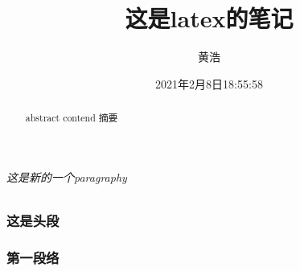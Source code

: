 \documentclass[utf8]{ctexart}
\begin{document}
\title{这是latex的笔记}
\author{黄浩}
\date{2021年2月8日18:55:58}
\maketitle
\tableofcontents
\part{}
\section{}
\subsection{}
\subsubsection{}
\paragraph{这是新的一个paragraphy}
\subparagraph{}
\section{这是头段}
\begin{abstract}
    abstract contend 摘要%
\end{abstract}
\setcounter{page}{7}
\section{第一段络}
\end{document}
